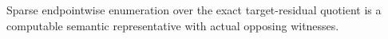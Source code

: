 Sparse endpointwise enumeration over the exact target-residual quotient is a computable semantic representative with actual opposing witnesses.